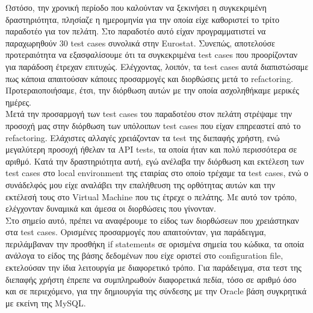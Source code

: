 Ωστόσο, την χρονική περίοδο που καλούνταν να ξεκινήσει η συγκεκριμένη δραστηριότητα, πλησίαζε η ημερομηνία για την οποία είχε καθοριστεί το τρίτο παραδοτέο για τον πελάτη. Στο παραδοτέο αυτό είχαν προγραμματιστεί 
να παραχωρηθούν 30 test cases συνολικά στην Eurostat. Συνεπώς, αποτελούσε προτεραιότητα να εξασφαλίσουμε ότι τα συγκεκριμένα test cases που προορίζονταν για παράδοση έτρεχαν επιτυχώς. Ελέγχοντας, λοιπόν, τα test cases 
αυτά διαπιστώσαμε πως κάποια απαιτούσαν κάποιες προσαρμογές και διορθώσεις μετά το refactoring. Προτεραιοποιήσαμε, έτσι, την διόρθωση αυτών με την οποία ασχοληθήκαμε μερικές ημέρες.\\

Μετά την προσαρμογή των test cases του παραδοτέου στον πελάτη στρέψαμε την προσοχή μας στην διόρθωση των υπόλοιπων test cases που είχαν επηρεαστεί από το refactoring. Ελάχιστες αλλαγές χρειάζονταν τα 
test της διεπαφής χρήστη, ενώ μεγαλύτερη προσοχή ήθελαν τα API tests, τα οποία ήταν και πολύ περισσότερα σε αριθμό. Κατά την δραστηριότητα αυτή, εγώ ανέλαβα την διόρθωση και εκτέλεση των test cases στο local 
environment της εταιρίας στο οποίο τρέχαμε τα test cases, ενώ ο συνάδελφός μου είχε αναλάβει την επαλήθευση της ορθότητας αυτών και την εκτέλεσή τους στο Virtual Machine που τις έτρεχε ο πελάτης. Με αυτό τον 
τρόπο, ελέγχονταν δυναμικά και άμεσα οι διορθώσεις που γίνονταν.\\

Στο σημείο αυτό, πρέπει να αναφέρουμε το είδος των διορθώσεων που χρειάστηκαν στα test cases. Ορισμένες προσαρμογές που απαιτούνταν, για παράδειγμα, περιλάμβαναν την προσθήκη if statements σε ορισμένα σημεία του 
κώδικα, τα οποία ανάλογα το είδος της βάσης δεδομένων που είχε οριστεί στο configuration file, εκτελούσαν την ίδια λειτουργία με διαφορετικό τρόπο. Για παράδειγμα, στα τεστ της διεπαφής χρήστη έπρεπε να συμπληρωθούν 
διαφορετικά πεδία, τόσο σε αριθμό όσο και σε περιεχόμενο, για την δημιουργία της σύνδεσης με την Oracle βάση συγκρητικά με εκείνη της MySQL.

